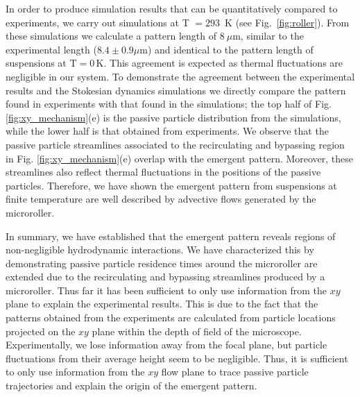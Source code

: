\documentclass[12pt]{article}
\begin{document}
In order to produce simulation results that can be quantitatively compared to experiments, we carry out simulations at T $= 293$~K (see Fig.~\ref{fig:roller}). From these simulations we calculate a pattern length of $8 \ \mu$m, similar to the experimental length ($8.4 \pm 0.9 \mu \mathrm{m}$) and identical to the pattern length of suspensions at $\mathrm{T} = 0 \, \mathrm{K}$. This agreement is expected as thermal fluctuations are negligible in our system. To demonstrate the agreement between the experimental results and the Stokesian dynamics simulations we directly compare the pattern found in experiments with that found in the simulations; the top half of Fig. \ref{fig:xy_mechanism}(e) is the passive particle distribution from the simulations, while the lower half is that obtained from experiments. We observe that the passive particle streamlines associated to the recirculating and bypassing region in Fig. \ref{fig:xy_mechanism}(e) overlap with the emergent pattern. Moreover, these streamlines also reflect thermal fluctuations in the positions of the passive particles. Therefore, we have shown the emergent pattern from suspensions at finite temperature are well described by advective flows generated by the microroller. 

In summary, we have established that the emergent pattern reveals regions of non-negligible hydrodynamic interactions. We have characterized this by demonstrating passive particle residence times around the microroller are extended due to the recirculating and bypassing streamlines produced by a microroller. 
%
Thus far it has been sufficient to only use information from the $xy$ plane to explain the experimental results. This is due to the fact that the patterns obtained from the experiments are calculated from particle locations projected on the $xy$ plane within the depth of field of the microscope. Experimentally, we lose information away from the focal plane, but particle fluctuations from their average height seem to be negligible. Thus, it is sufficient to only use information from the $xy$ flow plane to trace passive particle trajectories and explain the origin of the emergent pattern.

%
\end{document}
